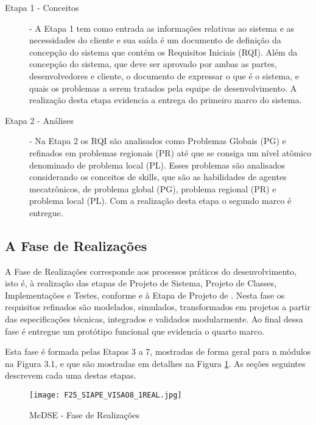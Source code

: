 \begin{description}
 	 \item[Etapa 1 - Conceitos] - A Etapa 1 tem como entrada as informações relativas ao sistema e as necessidades do cliente e sua saída é um documento de definição da concepção do sistema que contém os Requisitos Iniciais (RQI). Além da concepção do sistema, que deve ser aprovado por ambas as partes, desenvolvedores e cliente, o documento de expressar o que é o sistema, e quais os problemas a serem tratados pela equipe de desenvolvimento. A realização desta etapa evidencia a entrega do primeiro marco do sistema.
 	 
 	 \item[Etapa 2 - Análises] -  Na Etapa 2 os RQI são analisados como Problemas Globais (PG) e refinados em problemas regionais (PR) até que se consiga um nível atômico denominado de problema local (PL). Esses problemas são analisados considerando os conceitos de skills, que são as habilidades de agentes mecatrônicos, de problema global (PG), problema regional (PR) e problema local (PL). Com a realização desta etapa o segundo marco é entregue.  
 	 
 \end{description}
 

\subsection{A Fase de Realizações}
 
A Fase de Realizações corresponde aos processos práticos do desenvolvimento, isto é, à realização das etapas de Projeto de Sistema, Projeto de Classes, Implementações e Testes, conforme  e à Etapa de Projeto de . Nesta fase os requisitos refinados são modelados, simulados, transformados em projetos a partir das especificações técnicas, integrados e validados modularmente. Ao final dessa fase é entregue um protótipo funcional que evidencia o quarto marco.
 
Esta fase é formada pelas Etapas 3 a 7, mostradas de forma geral para n módulos na Figura 3.1, e que são mostradas em detalhes na Figura \ref{F13_2}. As seções seguintes descrevem cada uma destas etapas.
 	
\begin{figure}[h]
	\centering
	\texttt{[image: F25\_SIAPE\_VISAO8\_1REAL.jpg]} 
	\caption{MeDSE - Fase de Realizações}
	\label{F13_2}
\end{figure}
 	

